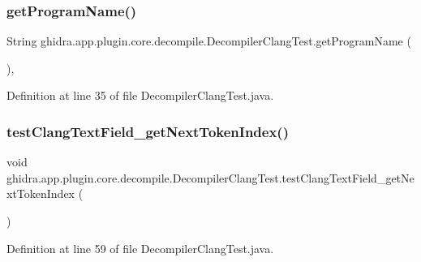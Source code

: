 \subsubsection{\texorpdfstring{getProgramName()}{getProgramName()}}
{\footnotesize\ttfamily String ghidra.\+app.\+plugin.\+core.\+decompile.\+Decompiler\+Clang\+Test.\+get\+Program\+Name (\begin{DoxyParamCaption}{ }\end{DoxyParamCaption})\hspace{0.3cm}{\ttfamily [inline]}, {\ttfamily [protected]}}



Definition at line 35 of file Decompiler\+Clang\+Test.\+java.

\mbox{\label{classghidra_1_1app_1_1plugin_1_1core_1_1decompile_1_1_decompiler_clang_test_a1fde4a416e006da18ed02f4e4496954d}} 
\subsubsection{\texorpdfstring{testClangTextField\_getNextTokenIndex()}{testClangTextField\_getNextTokenIndex()}}
{\footnotesize\ttfamily void ghidra.\+app.\+plugin.\+core.\+decompile.\+Decompiler\+Clang\+Test.\+test\+Clang\+Text\+Field\+\_\+get\+Next\+Token\+Index (\begin{DoxyParamCaption}{ }\end{DoxyParamCaption})\hspace{0.3cm}{\ttfamily [inline]}}



Definition at line 59 of file Decompiler\+Clang\+Test.\+java.

